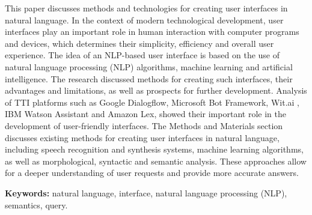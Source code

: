 This paper discusses methods and technologies for creating user
interfaces in natural language. In the context of modern technological
development, user interfaces play an important role in human interaction
with computer programs and devices, which determines their simplicity,
efficiency and overall user experience. The idea of an NLP-based user
interface is based on the use of natural language processing (NLP)
algorithms, machine learning and artificial intelligence. The research
discussed methods for creating such interfaces, their advantages and
limitations, as well as prospects for further development. Analysis of
TTI platforms such as Google Dialogflow, Microsoft Bot Framework, Wit.ai
, IBM Watson Assistant and Amazon Lex, showed their important role in
the development of user-friendly interfaces. The Methods and Materials
section discusses existing methods for creating user interfaces in
natural language, including speech recognition and synthesis systems,
machine learning algorithms, as well as morphological, syntactic and
semantic analysis. These approaches allow for a deeper understanding of
user requests and provide more accurate answers.

{\bfseries Keywords:} natural language, interface, natural language
processing (NLP), semantics, query.

